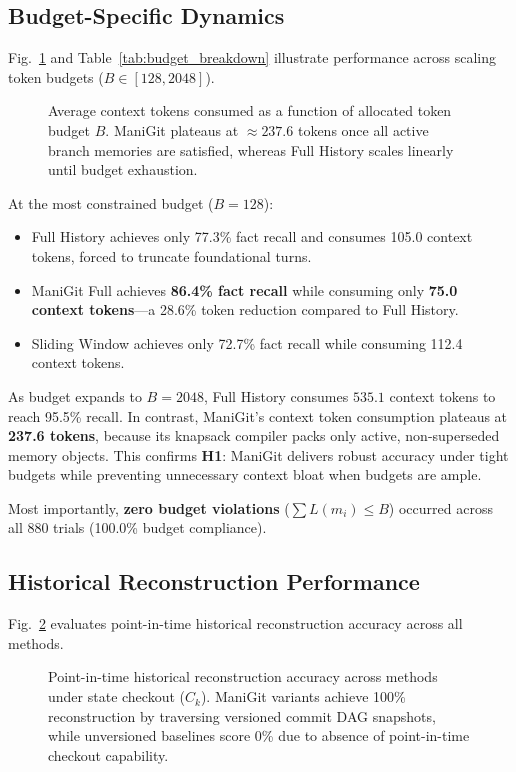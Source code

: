 \subsection{Budget-Specific Dynamics}
Fig.~\ref{fig:budget_performance} and Table~\ref{tab:budget_breakdown} illustrate performance across scaling token budgets ($B \in [128, 2048]$).

\begin{figure}[t]
\centering

\caption{Average context tokens consumed as a function of allocated token budget $B$. ManiGit plateaus at $\approx 237.6$ tokens once all active branch memories are satisfied, whereas Full History scales linearly until budget exhaustion.}
\label{fig:budget_performance}
\end{figure}

At the most constrained budget ($B=128$):
\begin{itemize}
    \item Full History achieves only 77.3\% fact recall and consumes 105.0 context tokens, forced to truncate foundational turns.
    \item ManiGit Full achieves \textbf{86.4\% fact recall} while consuming only \textbf{75.0 context tokens}—a 28.6\% token reduction compared to Full History.
    \item Sliding Window achieves only 72.7\% fact recall while consuming 112.4 context tokens.
\end{itemize}

As budget expands to $B=2048$, Full History consumes $535.1$ context tokens to reach 95.5\% recall. In contrast, ManiGit's context token consumption plateaus at \textbf{237.6 tokens}, because its knapsack compiler packs only active, non-superseded memory objects. This confirms \textbf{H1}: ManiGit delivers robust accuracy under tight budgets while preventing unnecessary context bloat when budgets are ample.

Most importantly, \textbf{zero budget violations} ($\sum L(m_i) \le B$) occurred across all 880 trials (100.0\% budget compliance).

\subsection{Historical Reconstruction Performance}
\label{sec:historical_results}
Fig.~\ref{fig:historical_recovery} evaluates point-in-time historical reconstruction accuracy across all methods.

\begin{figure}[t]
\centering

\caption{Point-in-time historical reconstruction accuracy across methods under state checkout ($C_k$). ManiGit variants achieve 100\% reconstruction by traversing versioned commit DAG snapshots, while unversioned baselines score 0\% due to absence of point-in-time checkout capability.}
\label{fig:historical_recovery}
\end{figure}


